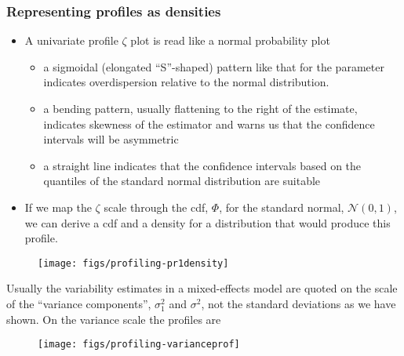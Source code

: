 \documentclass[dvipsnames,pdflatex,beamer]{beamer}
\begin{document}
\begin{frame}
  \frametitle{Representing profiles as densities}
  \begin{itemize}
  \item A univariate profile $\zeta$ plot is read like a normal probability plot
    \begin{itemize}
    \item a sigmoidal (elongated ``S''-shaped) pattern like that for
      the  parameter indicates overdispersion
      relative to the normal distribution.
    \item a bending pattern, usually flattening to the right of the
      estimate, indicates skewness of the estimator and warns us that
      the confidence intervals will be asymmetric
    \item a straight line indicates that the confidence intervals
      based on the quantiles of the standard normal distribution are suitable
    \end{itemize}
  \item If we map the $\zeta$ scale through the cdf, $\Phi$, for the
    standard normal, $\mathcal{N}(0,1)$, we can derive a cdf and a
    density for a distribution that would produce this profile.
  \end{itemize}
\end{frame}

\begin{frame}[fragile]
\begin{figure}[tb]
  \centering
\texttt{[image: figs/profiling-pr1density]}
\end{figure}
\end{frame}

\begin{frame}[fragile]

  Usually the variability estimates in a mixed-effects model are
  quoted on the scale of the ``variance components'', $\sigma_1^2$ and
  $\sigma^2$, not the standard deviations as we have shown.  On the variance scale the profiles are
  \begin{figure}[tb]
    \centering
\texttt{[image: figs/profiling-varianceprof]}
  \end{figure}
\end{frame}
\end{document}
